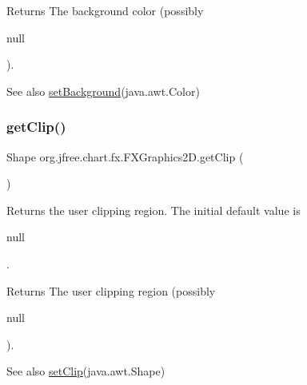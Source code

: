 \begin{DoxyReturn}{Returns}
The background color (possibly
\begin{DoxyCode}
null 
\end{DoxyCode}
 ).
\end{DoxyReturn}
\begin{DoxySeeAlso}{See also}
\mbox{\hyperlink{classorg_1_1jfree_1_1chart_1_1fx_1_1_f_x_graphics2_d_a51d0f635dc7888223c326861aa4849f2}{set\+Background}}(java.\+awt.\+Color) 
\end{DoxySeeAlso}
\mbox{\label{classorg_1_1jfree_1_1chart_1_1fx_1_1_f_x_graphics2_d_adab65fa84e10b25840c2d8af0f2e3356}} 
\subsubsection{\texorpdfstring{get\+Clip()}{getClip()}}
{\footnotesize\ttfamily Shape org.\+jfree.\+chart.\+fx.\+F\+X\+Graphics2\+D.\+get\+Clip (\begin{DoxyParamCaption}{ }\end{DoxyParamCaption})}

Returns the user clipping region. The initial default value is 
\begin{DoxyCode}
null 
\end{DoxyCode}
 .

\begin{DoxyReturn}{Returns}
The user clipping region (possibly
\begin{DoxyCode}
null 
\end{DoxyCode}
 ).
\end{DoxyReturn}
\begin{DoxySeeAlso}{See also}
\mbox{\hyperlink{classorg_1_1jfree_1_1chart_1_1fx_1_1_f_x_graphics2_d_a47e55ffaa4b2dcc54b53c506e4ed67be}{set\+Clip}}(java.\+awt.\+Shape) 
\end{DoxySeeAlso}
\mbox{\label{classorg_1_1jfree_1_1chart_1_1fx_1_1_f_x_graphics2_d_a037c9ec5dddafc7cb1704f356380fd09}} 
